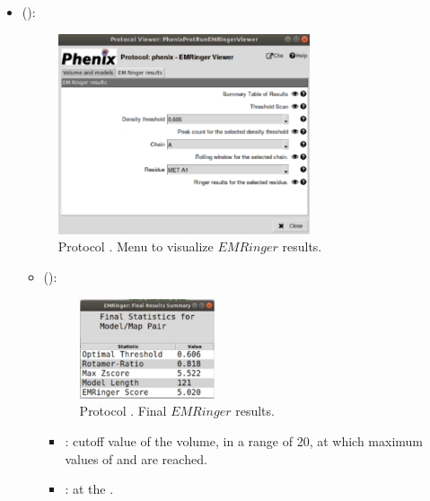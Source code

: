 \begin{itemize}
\begin{itemize}
     \item {} ():
     
     \begin{figure}[H]
     \centering 
     \captionsetup{width=.7\linewidth} 
     \includegraphics[width=0.70\textwidth]{Images_appendix/Fig141.pdf}
     \caption{Protocol . Menu to visualize $EMRinger$ results.}
     \label{fig:app_protocol_emringer_3}
    \end{figure}
      \begin{itemize}
        \item {} ():
        \begin{figure}[H]
         \centering 
         \captionsetup{width=.7\linewidth} 
         \includegraphics[width=0.40\textwidth]{Images_appendix/Fig142.pdf}
         \caption{Protocol . Final $EMRinger$ results.}
        \label{fig:app_protocol_emringer_4}
     \end{figure}
         \begin{itemize}
          \item {}:  cutoff value of the volume, in a range of 20, at which maximum values of  and  are reached. 
          \item {}:  at the .

\end{itemize}
\end{itemize}
\end{itemize}
\end{itemize}
